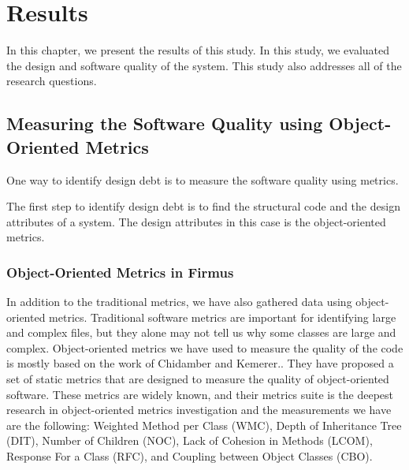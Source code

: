 
\chapter{Results}
In this chapter, we present the results of this study. 
In this study, we evaluated the design and software quality of the system. This study also addresses all of the research questions. 







\section{Measuring the Software Quality using Object-Oriented Metrics}
One way to identify design debt is to measure the software quality using metrics. 

The first step to identify design debt is to find the structural code and the design attributes of a system. The design attributes in this case is the object-oriented metrics.








\subsection{Object-Oriented Metrics in Firmus}
In addition to the traditional metrics, we have also gathered data using object-oriented metrics. Traditional software metrics are important for identifying large and complex files, but they alone may not tell us why some classes are large and complex. Object-oriented metrics we have used to measure the quality of the code is mostly based on the work of Chidamber and Kemerer.\cite{chidamber1994metrics}. They have proposed a set of static metrics that are designed to measure the quality of object-oriented software. These metrics are widely known, and their metrics suite is the deepest research in object-oriented metrics investigation and the measurements we have are the following: Weighted Method per Class (WMC), Depth of Inheritance Tree (DIT), Number of Children (NOC), Lack of Cohesion in Methods (LCOM), Response For a Class (RFC), and Coupling between Object Classes (CBO). 


